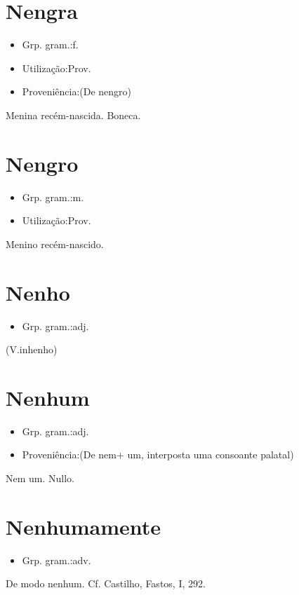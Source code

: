 \section{Nengra}
\begin{itemize}
\item {Grp. gram.:f.}
\end{itemize}
\begin{itemize}
\item {Utilização:Prov.}
\end{itemize}
\begin{itemize}
\item {Proveniência:(De \textunderscore nengro\textunderscore )}
\end{itemize}
Menina recém-nascida.
Boneca.
\section{Nengro}
\begin{itemize}
\item {Grp. gram.:m.}
\end{itemize}
\begin{itemize}
\item {Utilização:Prov.}
\end{itemize}
Menino recém-nascido.
\section{Nenho}
\begin{itemize}
\item {Grp. gram.:adj.}
\end{itemize}
(V.inhenho)
\section{Nenhum}
\begin{itemize}
\item {Grp. gram.:adj.}
\end{itemize}
\begin{itemize}
\item {Proveniência:(De \textunderscore nem\textunderscore  + \textunderscore um\textunderscore , interposta uma consoante palatal)}
\end{itemize}
Nem um.
Nullo.
\section{Nenhumamente}
\begin{itemize}
\item {Grp. gram.:adv.}
\end{itemize}
De modo nenhum. Cf. Castilho, \textunderscore Fastos\textunderscore , I, 292.
